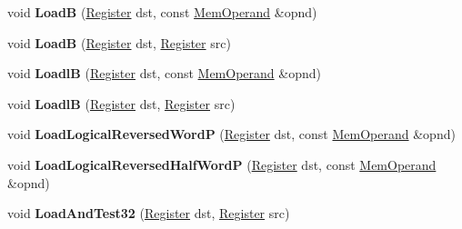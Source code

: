 \begin{DoxyCompactItemize}
\item 
\mbox{\label{classv8_1_1internal_1_1TurboAssembler_a5cd1a2c84b39fcc4a8c4be3e6e07b743}} 
void {\bfseries LoadB} (\mbox{\hyperlink{classv8_1_1internal_1_1Register}{Register}} dst, const \mbox{\hyperlink{classv8_1_1internal_1_1MemOperand}{Mem\+Operand}} \&opnd)
\item 
\mbox{\label{classv8_1_1internal_1_1TurboAssembler_a87b082f0f3c393a4b74e2de445ab6e54}} 
void {\bfseries LoadB} (\mbox{\hyperlink{classv8_1_1internal_1_1Register}{Register}} dst, \mbox{\hyperlink{classv8_1_1internal_1_1Register}{Register}} src)
\item 
\mbox{\label{classv8_1_1internal_1_1TurboAssembler_ad1c7d943e7ee30edec49ace512e3a993}} 
void {\bfseries LoadlB} (\mbox{\hyperlink{classv8_1_1internal_1_1Register}{Register}} dst, const \mbox{\hyperlink{classv8_1_1internal_1_1MemOperand}{Mem\+Operand}} \&opnd)
\item 
\mbox{\label{classv8_1_1internal_1_1TurboAssembler_acca440607718ee9f64bfc544d2ca1ace}} 
void {\bfseries LoadlB} (\mbox{\hyperlink{classv8_1_1internal_1_1Register}{Register}} dst, \mbox{\hyperlink{classv8_1_1internal_1_1Register}{Register}} src)
\item 
\mbox{\label{classv8_1_1internal_1_1TurboAssembler_aabaaefa2dabef1814eb1e12bbcb4860f}} 
void {\bfseries Load\+Logical\+Reversed\+WordP} (\mbox{\hyperlink{classv8_1_1internal_1_1Register}{Register}} dst, const \mbox{\hyperlink{classv8_1_1internal_1_1MemOperand}{Mem\+Operand}} \&opnd)
\item 
\mbox{\label{classv8_1_1internal_1_1TurboAssembler_a1d9672345aaca74c762e679a43ced836}} 
void {\bfseries Load\+Logical\+Reversed\+Half\+WordP} (\mbox{\hyperlink{classv8_1_1internal_1_1Register}{Register}} dst, const \mbox{\hyperlink{classv8_1_1internal_1_1MemOperand}{Mem\+Operand}} \&opnd)
\item 
\mbox{\label{classv8_1_1internal_1_1TurboAssembler_ab23834d56592c0ebb7bcfa13801516d1}} 
void {\bfseries Load\+And\+Test32} (\mbox{\hyperlink{classv8_1_1internal_1_1Register}{Register}} dst, \mbox{\hyperlink{classv8_1_1internal_1_1Register}{Register}} src)

\end{DoxyCompactItemize}
